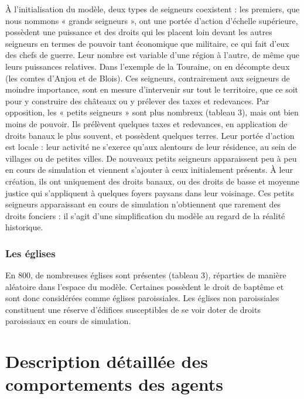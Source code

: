 \documentclass[12pt, a4paper, oneside]{book}
\begin{document}
	À l'initialisation du modèle, deux types de seigneurs coexistent : les premiers, que nous nommons « grands seigneurs », ont une portée d'action d'échelle supérieure, possèdent une puissance et des droits qui les placent loin devant les autres seigneurs en termes de pouvoir tant économique que militaire, ce qui fait d'eux des chefs de guerre.
	Leur nombre est variable d'une région à l'autre, de même que leurs puissances relatives.
	Dans l'exemple de la Touraine, on en décompte deux (les comtes d'Anjou et de Blois).
	Ces seigneurs, contrairement aux seigneurs de moindre importance, sont en mesure d'intervenir sur tout le territoire, que ce soit pour y construire des châteaux ou y prélever des taxes et redevances.
	Par opposition, les « petits seigneurs » sont plus nombreux (tableau 3), mais ont bien moins de pouvoir.
	Ils prélèvent quelques taxes et redevances, en application de droits banaux le plus souvent, et possèdent quelques terres.
	Leur portée d'action est locale : leur activité ne s'exerce qu'aux alentours de leur résidence, au sein de villages ou de petites villes.
	De nouveaux petits seigneurs apparaissent peu à peu en cours de simulation et viennent s'ajouter à ceux initialement présents.
	À leur création, ils ont uniquement des droits banaux, ou des droits de basse et moyenne justice qui s'appliquent à quelques foyers paysans dans leur voisinage.
	Ces petits seigneurs apparaissant en cours de simulation n'obtiennent que rarement des droits fonciers : il s'agit d'une simplification du modèle au regard de la réalité historique.
	
	\subsubsection{Les églises}
	
	En 800, de nombreuses églises sont présentes (tableau 3), réparties de manière aléatoire dans l'espace du modèle. 
	Certaines possèdent le droit de baptême et sont donc considérées comme églises paroissiales.
	Les églises non paroissiales constituent une réserve d'édifices susceptibles de se voir doter de droits paroissiaux en cours de simulation.
	
	\section[Comportements des agents]{Description détaillée des comportements des agents}
	
\end{document}
